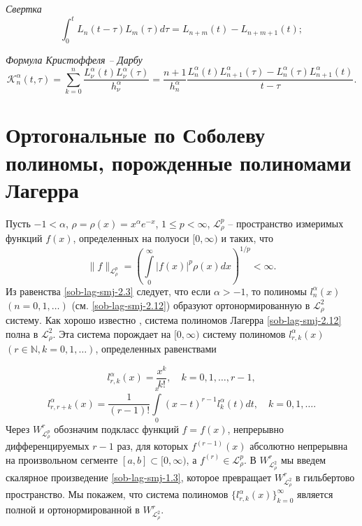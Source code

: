 \textit{Свертка}
\begin{equation}
\label{sob-lag-smj-2.15}
\int_0^{t} L_{n}(t-\tau) L_{m}(\tau) d\tau = L_{n+m}(t) - L_{n+m+1}(t);
\end{equation}

\textit{Формула Кристоффеля -- Дарбу}
\begin{equation}\label{sob-lag-smj-2.16}
\mathcal{K}_n^\alpha(t,\tau)=
\sum\limits_{k=0}^{n}\frac{L_\nu^\alpha(t)L_\nu^\alpha(\tau)}{h_\nu^\alpha}=
\frac{n+1}{h_n^\alpha}
\frac{L_n^\alpha(t)L_{n+1}^\alpha(\tau) - L_n^\alpha(\tau)L_{n+1}^\alpha(t)}{t-\tau}.
\end{equation}





\section{Ортогональные по Соболеву полиномы, порожденные полиномами Лагерра}
Пусть $-1<\alpha$,  $\rho=\rho(x)=x^\alpha e^{-x}$, $1\le p<\infty $,  $\mathcal{L}_{\rho}^p$ -- пространство измеримых функций $f(x)$, определенных на полуоси $[0,\infty)$ и таких, что
     $$
\|f\|_{\mathcal{L}_{\rho}^p}=
\left(\int\limits_0^\infty|f(x)|^p\rho(x)dx\right)^{1/p}<\infty.
    $$
Из равенства \eqref{sob-lag-smj-2.3} следует, что если $\alpha>-1$, то полиномы $l_n^{\alpha}(x)$ $(n=0,1,\ldots)$ (см. \eqref{sob-lag-smj-2.12})
образуют ортонормированную  в $\mathcal{L}_\rho^2$  систему. Как хорошо известно \cite{sob-lag-smj-Sege}, система полиномов Лагерра  \eqref{sob-lag-smj-2.12} полна в $\mathcal{L}_\rho^2$.   Эта система порождает на $[0,\infty)$ систему полиномов $l_{r,k}^{\alpha}(x)$ $(r \in \mathbb{N}, k=0,1,\ldots)$, определенных равенствами

  \begin{equation}\label{sob-lag-smj-3.1}
l_{r,k}^{\alpha}(x) =\frac{x^k}{k!}, \quad k=0,1,\ldots, r-1,
\end{equation}
  \begin{equation}\label{sob-lag-smj-3.2}
l_{r,r+k}^{\alpha}(x) =\frac{1}{(r-1)!}\int\limits_{0}^x(x-t)^{r-1}l_{k}^{\alpha}(t)dt, \quad k=0,1,\ldots.
\end{equation}
 Через $W_{\mathcal{L}_{\rho}^p}^r$ обозначим  подкласс функций $f=f(x)$,
непрерывно дифференцируемых $r-1$ раз, для которых $f^{(r-1)}(x)$
абсолютно непрерывна на произвольном сегменте $[a,b]\subset[0,\infty)$,
а $f^{(r)}\in \mathcal{L}_{\rho}^p$. В $W_{\mathcal{L}_{\rho}^2}^r$ мы введем скалярное произведение \eqref{sob-lag-smj-1.3}, которое превращает $W_{\mathcal{L}_{\rho}^2}^r$ в гильбертово пространство.
Мы покажем, что система полиномов $\{l_{r,k}^{\alpha}(x)\}_{k=0}^\infty$ является полной и ортонормированной в $W_{\mathcal{L}_{\rho}^2}^r$.

